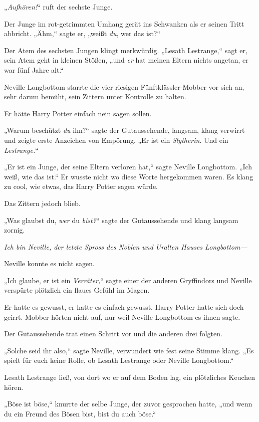 {„\emph{Aufhören!}“ ruft der sechste Junge.

Der Junge im rot-getrimmten Umhang gerät ins Schwanken als er seinen Tritt abbricht. „Ähm,“ sagte er, „weißt \emph{du}, wer das ist?“

Der Atem des sechsten Jungen klingt merkwürdig. „Lesath Lestrange,“ sagt er, sein Atem geht in kleinen Stößen, „und \emph{er} hat meinen Eltern nichts angetan, er war fünf Jahre alt.“

\later

Neville Longbottom starrte die vier riesigen Fünftklässler-Mobber vor sich an, sehr darum bemüht, sein Zittern unter Kontrolle zu halten.

Er hätte Harry Potter einfach nein sagen sollen.

„Warum beschützt \emph{du} ihn?“ sagte der Gutaussehende, langsam, klang verwirrt und zeigte erste Anzeichen von Empörung. „Er ist ein \emph{Slytherin}. Und ein \emph{Lestrange.}“

„Er ist ein Junge, der seine Eltern verloren hat,“ sagte Neville Longbottom. „Ich weiß, wie das ist.“ Er wusste nicht wo diese Worte hergekommen waren. Es klang zu cool, wie etwas, das Harry Potter sagen würde.

Das Zittern jedoch blieb.

„Was glaubst du, \emph{wer} du \emph{bist?}“ sagte der Gutaussehende und klang langsam zornig.

\emph{Ich bin Neville, der letzte Spross des Noblen und Uralten Hauses Longbottom—}

Neville konnte es nicht sagen.

„Ich glaube, er ist ein \emph{Verräter,}“ sagte einer der anderen Gryffindors und Neville verspürte plötzlich ein flaues Gefühl im Magen.

Er hatte es gewusst, er hatte es einfach gewusst. Harry Potter hatte sich doch geirrt. Mobber hörten nicht auf, nur weil Neville Longbottom es ihnen sagte.

Der Gutaussehende trat einen Schritt vor und die anderen drei folgten.

„Solche seid ihr also,“ sagte Neville, verwundert wie fest seine Stimme klang. „Es spielt für euch keine Rolle, ob Lesath Lestrange oder Neville Longbottom.“

Lesath Lestrange ließ, von dort wo er auf dem Boden lag, ein plötzliches Keuchen hören.

„Böse ist böse,“ knurrte der selbe Junge, der zuvor gesprochen hatte, „und wenn du ein Freund des Bösen bist, bist du auch böse.“

}
